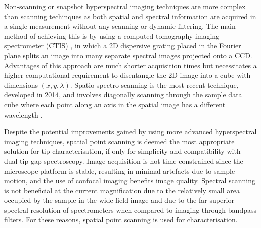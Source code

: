 \documentclass{article}
\begin{document}
Non-scanning or snapshot hyperspectral imaging techniques are more complex than scanning techinques as both spatial and spectral information are acquired in a single measurement without any scanning or dynamic filtering. The main method of achieving this is by using a computed tomography imaging spectrometer (CTIS) \cite{okamoto1991simultaneous, bulygin1992spectrotomography, okamoto1993simultaneous, descour1995computed}, in which a 2D dispersive grating placed in the Fourier plane splits an image into many separate spectral images projected onto a CCD. Advantages of this approach are much shorter acquisition times but necessitates a higher computational requirement to disentangle the 2D image into a cube with dimensions $(x,y,\lambda)$.
Spatio-spectro scanning is the most recent technique, developed in 2014, and involves diagonally scanning through the sample data cube where each point along an axis in the spatial image has a different wavelength \cite{grusche2014basic}. %

Despite the potential improvements gained by using more advanced hyperspectral imaging techniques, spatial point scanning is deemed the most appropriate solution for tip characterisation, if only for simplicity and compatibility with dual-tip gap spectroscopy. Image acquisition is not time-constrained since the microscope platform is stable, resulting in minimal artefacts due to sample motion, and the use of confocal imaging benefits image quality. Spectral scanning is not beneficial at the current magnification due to the relatively small area occupied by the sample in the wide-field image and due to the far superior spectral resolution of spectrometers when compared to imaging through bandpass filters. For these reasons, spatial point scanning is used for characterisation.
\end{document}
